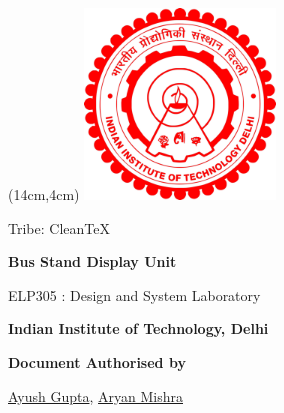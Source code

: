 \renewcommand{\thefootnote}{\alph{footnote}}
\begin{titlepage}

       \begin{textblock*}{6cm}(14cm,4cm)
       \includegraphics[width=2in]{Files/Images/iitdlogo.png}
       \end{textblock*}
            \vskip1in
	        \raggedright
            \vskip3in
              {%
				\fontsize{20}{28}
				\boldmath
				\sffamily
				 Tribe: CleanTeX
				\par
            }
             \vskip0.25in
           
             {
				\Large
				\fontsize{28}{32}
				\bfseries
				\boldmath
				\sffamily
                Bus Stand Display Unit
				\par
            }
            \vskip0.15in
             {
				\fontsize{18}{18}
				\sffamily
                
				\par
            }
            \vskip0.15in
             {
				\fontsize{16}{16}
				\sffamily
                ELP305 : Design and System Laboratory
				\par
            }
            \vskip0.15in
             {
				\fontsize{16}{14}
				\sffamily
                \textbf{Indian Institute of Technology, Delhi}
                \par
            }
    \vspace{0.5in}
    {
        \normalsize
        \sffamily
        \textbf{\textcolor{tuberlindarkgray}{Document Authorised by}}\par \vspace{0.125cm}
        {\href{https://www.linkedin.com/in/ayush-gupta-undergraduate/}{Ayush Gupta}, \href{http://linkedin.com/in/aryan-mishra-04j}{Aryan Mishra}}

}
\end{titlepage}
